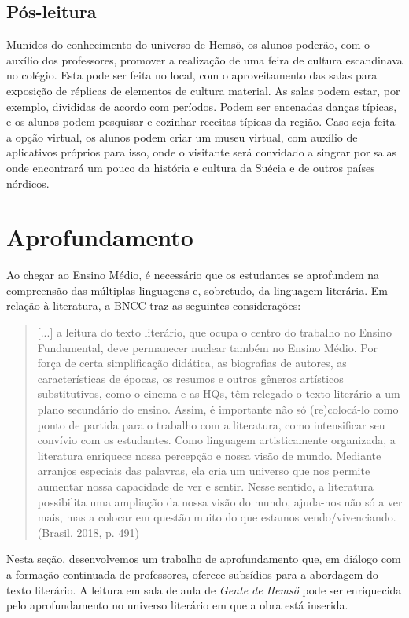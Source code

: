 \documentclass[12pt]{extarticle}
\begin{document}
\subsection{Pós-leitura}

Munidos do conhecimento do universo de Hemsö, os alunos
poderão, com o auxílio dos professores, promover a realização de uma
feira de cultura escandinava no colégio. Esta pode ser feita no local,
com o aproveitamento das salas para exposição de réplicas de elementos
de cultura material. As salas podem estar, por exemplo, divididas de
acordo com períodos. Podem ser encenadas danças típicas, e os alunos
podem pesquisar e cozinhar receitas típicas da região. Caso seja feita a
opção virtual, os alunos podem criar um museu virtual, com auxílio de
aplicativos próprios para isso, onde o visitante será convidado a
singrar por salas onde encontrará um pouco da história e cultura da
Suécia e de outros países nórdicos.

\section{Aprofundamento}

Ao chegar ao Ensino Médio, é necessário que os estudantes se aprofundem
na compreensão das múltiplas linguagens e, sobretudo, da linguagem
literária. Em relação à literatura, a BNCC traz as seguintes
considerações:

\begin{quote}
{[}...{]} a leitura do texto literário, que ocupa o centro do trabalho
no Ensino Fundamental, deve permanecer nuclear também no Ensino Médio.
Por força de certa simplificação didática, as biografias de autores, as
características de épocas, os resumos e outros gêneros artísticos
substitutivos, como o cinema e as HQs, têm relegado o texto literário a
um plano secundário do ensino. Assim, é importante não só (re)colocá-lo
como ponto de partida para o trabalho com a literatura, como
intensificar seu convívio com os estudantes. Como linguagem
artisticamente organizada, a literatura enriquece nossa percepção e
nossa visão de mundo. Mediante arranjos especiais das palavras, ela cria
um universo que nos permite aumentar nossa capacidade de ver e sentir.
Nesse sentido, a literatura possibilita uma ampliação da nossa visão do
mundo, ajuda-nos não só a ver mais, mas a colocar em questão muito do
que estamos vendo/vivenciando. (Brasil, 2018, p. 491)
\end{quote}

Nesta seção, desenvolvemos um trabalho de aprofundamento que, em diálogo
com a formação continuada de professores, oferece subsídios para a
abordagem do texto literário. A leitura em sala de aula de \emph{Gente
de Hemsö} pode ser enriquecida pelo aprofundamento no universo literário
em que a obra está inserida.
\end{document}
